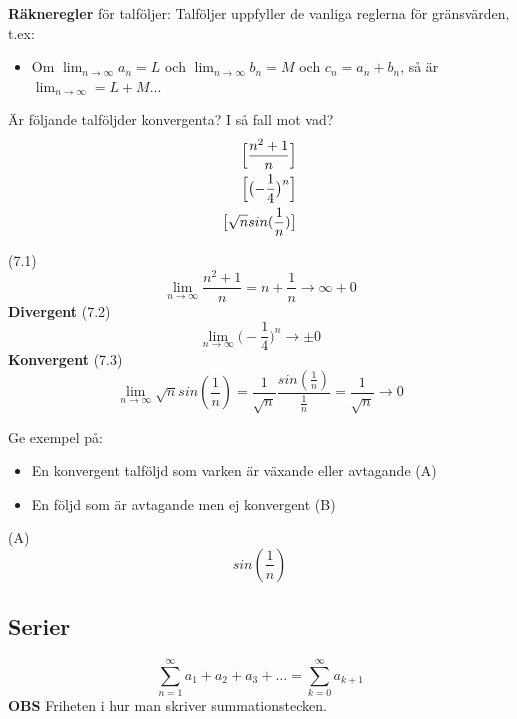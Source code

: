 \documentclass{report}
\begin{document}
\noindent
\textbf{Räkneregler} för talföljer:
Talföljer uppfyller de vanliga reglerna för gränsvärden, t.ex:
\begin{itemize}
	\item Om $ \lim_{n \to \infty} a_n = L $ och $ \lim_{n \to \infty} b_n = M $ och $ c_n = a_n + b_n $, så är $ \lim_{n \to \infty} = L+M $... 
\end{itemize}

\qs{}
{
Är följande talföljder konvergenta? I så fall mot vad?
\begin{align}
	\Bigl[ \frac{n^2+1}{n} \Bigr] \\
	\Bigl[ \bigl(  - \frac{1}{4}  \bigr)^n \Bigr] \\
	\bigl[ \sqrt{n} sin( \frac{1}{n} )  \bigr]
\end{align}
}

\sol (7.1)
\begin{equation*}
\lim_{n \to \infty} \frac{n^2+1}{n} = n + \frac{1}{n} \to \infty + 0 
\end{equation*}
\textbf{Divergent}
\sol (7.2)
\begin{equation*}
\lim_{n \to \infty} \bigl( - \frac{1}{4}  \bigr)^n \to \pm 0
\end{equation*}
\textbf{Konvergent}
\sol (7.3)
\begin{equation*}
\lim_{n \to \infty} \sqrt{n} sin( \frac{1}{n} ) = \frac{1}{ \sqrt{n} } \frac{sin( \frac{1}{n}  )}{ \frac{1}{n}  } = \frac{1}{ \sqrt{n} } \to 0 
\end{equation*}

\vspace{20pt}
\qs{}
{
Ge exempel på:
\begin{itemize}
	\item En konvergent talföljd som varken är växande eller avtagande (A)
	\item En följd som är avtagande men ej konvergent (B)
\end{itemize}
}

\sol (A)
\begin{equation*}
sin( \frac{1}{n} )
\end{equation*}

\subsection{Serier}
\begin{equation*}
	\sum_{n = 1}^{ \infty} a_1 + a_2 + a_3 + \ldots = \sum_{k = 0}^{ \infty} a_{k+1}
\end{equation*}
\textbf{OBS} Friheten i hur man skriver summationstecken.\\\\
\end{document}
